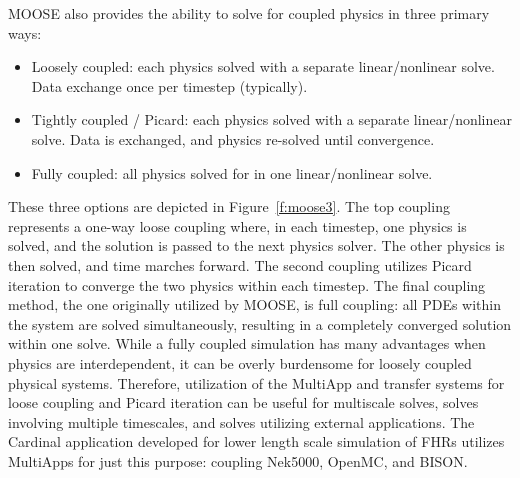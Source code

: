 MOOSE also provides the ability to solve for coupled physics in three primary ways:
\begin{itemize}
\item Loosely coupled: each physics solved with a separate linear/nonlinear solve. Data exchange once per
timestep (typically).
\item Tightly coupled / Picard: each physics solved with a separate linear/nonlinear solve. Data is exchanged, and physics re-solved until convergence.
\item Fully coupled: all physics solved for in one linear/nonlinear solve.
\end{itemize}
These three options are depicted in Figure~\ref{f:moose3}. The top coupling represents a one-way loose coupling where, in each timestep, one physics is solved, and the solution is passed to the next physics solver. The other physics is then solved, and time marches forward. The second coupling utilizes Picard iteration to converge the two physics within each timestep. The final coupling method, the one originally utilized by MOOSE, is full coupling: all PDEs within the system are solved simultaneously, resulting in a completely converged solution within one solve. While a fully coupled simulation has many advantages when physics are interdependent, it can be
overly burdensome for loosely coupled physical systems. Therefore, utilization of the MultiApp and transfer systems for loose coupling and Picard iteration can be useful for multiscale solves, solves involving multiple timescales, and solves utilizing external applications. The Cardinal application developed for lower length scale simulation of FHRs utilizes MultiApps for just this purpose: coupling Nek5000, OpenMC, and BISON.

